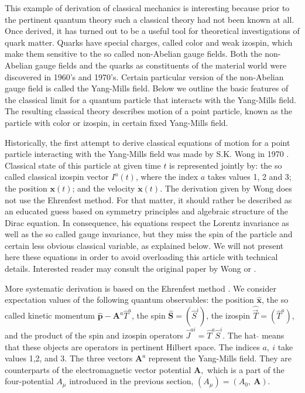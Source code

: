 \documentclass[12pt]{article}
\begin{document}
This example of derivation of classical mechanics is interesting because prior to the pertinent quantum theory such a classical theory had not been known at all. Once derived, it has turned out to be a useful tool for theoretical investigations of quark matter. Quarks have special charges, called color and weak izospin, which make them sensitive to the so called non-Abelian gauge fields. Both the non-Abelian gauge fields and the quarks as constituents of the material world were discovered in 1960's and 1970's. Certain particular
version of the non-Abelian gauge field is called the Yang-Mills field. Below we outline the basic features of the classical limit for a quantum particle that interacts with the Yang-Mills field. The resulting classical theory describes motion of a point particle, known as the particle with color or izospin, in certain fixed Yang-Mills field.

Historically, the first attempt to derive classical equations of motion for a point particle interacting with the Yang-Mills field was made by S.K. Wong in 1970 \cite{wong}. 
 Classical state of this particle at given time $t$ is represented jointly by: the so called classical izospin vector $I^a(t)$, where the index $a$ takes values 1, 2 and 3; the position $\mathbf{x}(t)$; and the velocity $\dot{\mathbf{x}}(t)$. The derivation given by Wong does not use the Ehrenfest method. For that matter, it should rather be described as an educated guess based on symmetry principles and algebraic structure of the Dirac equation. In consequence, his equations respect the Lorentz invariance as well as the so called gauge invariance, but they miss the spin of the particle and certain less obvious classical variable, as explained below. We will not present here these equations in order to avoid overloading this article with technical details. Interested reader may consult the original paper by Wong or \cite{aro2}. 


More systematic derivation is based on the Ehrenfest method \cite{aro2}. We consider expectation values of the following quantum observables: the position $\hat{\mathbf{x}}$, the so called kinetic momentum $ \hat{\mathbf{p}} - \mathbf{A}^a \hat{T}^a$, the spin $\hat{\mathbf{S}}= (\hat{S}^i)$, the izospin $\hat{\vec{T}}= (\hat{T}^a)$, and the product of the spin and izospin operators $\hat{J}^{ai} = \hat{T}^a \hat{S}^i$. The hat $\hat{}$ means that these objects are operators in pertinent Hilbert space. The indices $a, \:i $ take values 1,2, and 3. The three vectors $\mathbf{A}^a$ represent the Yang-Mills field. They are counterparts of the electromagnetic vector potential $\mathbf{A},$ which is a part of the four-potential $A_{\mu}$ introduced in the previous section, $(A_{\mu}) = ( A_0, \:\mathbf{A})$. 
\end{document}

